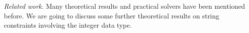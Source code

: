 
%
%
%
%
%
 
\noindent\emph{Related work.}
Many theoretical results and practical solvers have been mentioned before. We are going to discuss some further theoretical results on string constraints involving the integer data type.
%
%
%
%

